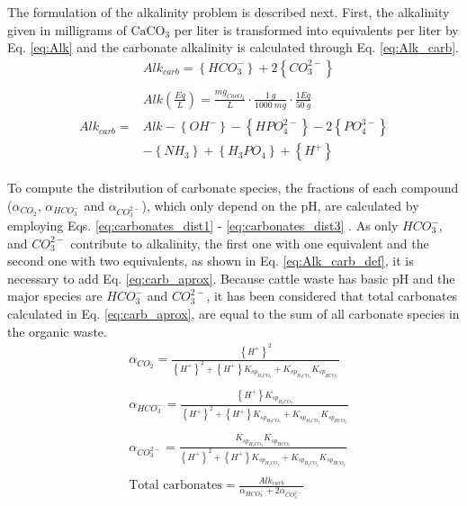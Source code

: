 \begin{refsection}[referencesCh3]
The formulation of the alkalinity problem is described next. First, the alkalinity given in milligrams of $\text{CaCO}_{3}$ per liter is transformed into equivalents per liter by Eq. \ref{eq:Alk} and the carbonate alkalinity is calculated through Eq. \ref{eq:Alk_carb}.
\begin{align}
&  Alk_{carb}= \left\{HCO_{3}^{-}\right\} + 2\left\{CO_{3}^{2-}\right\} \label{eq:Alk_carb_def}\\
\nonumber \\
& Alk \left(\frac{Eq}{L}\right) = \frac{mg_{CacO_{3}}}{L} \cdot \frac{1 \ g}{1000 \ mg} \cdot \frac{1 Eq}{50 \ g} \label{eq:Alk}
\end{align}
\begin{align}
\begin{split}
Alk_{carb}=&Alk-\left\{ OH^{-} \right\}-\left\{ HPO_{4}^{2-} \right\}- 2\left\{ PO_{4}^{3-}\right\} \\&-\left\{ NH_{3} \right\}+\left\{ H_{3}PO_{4} \right\}+\left\{ H^{+} \right\} \label{eq:Alk_carb}
\end{split}
\end{align}

To compute the distribution of carbonate species, the fractions of each compound ($\alpha_{CO_2}$, $\alpha_{HCO_{3}^{-}}$ and $\alpha_{CO_{3}^{2-}}$), which only depend on the pH, are calculated by employing Eqs. \ref{eq:carbonates_dist1} - \ref{eq:carbonates_dist3} \citep{WolfGladrow}. As only $HCO_{3}^{-}$, and $CO_{3}^{2-}$ contribute to alkalinity, the first one with one equivalent and the second one with two equivalents, as shown in Eq. \ref{eq:Alk_carb_def}, it is necessary  to add Eq. \ref{eq:carb_aprox}. Because cattle waste has basic pH and the major species are $HCO_{3}^{-}$ and $CO_{3}^{2-}$, it has been considered that total carbonates calculated in Eq. \ref{eq:carb_aprox}, are equal to the sum of all carbonate species in the organic waste.
\begin{align}
& \alpha_{CO_2} = \frac{\left\{ H^{+} \right\}^{2}}{\left\{ H^{+} \right\}^{2} + \left\{ H^{+} \right\}K_{sp_{H_{2}CO_{3}}}+K_{sp_{H_{2}CO_{3}}}K_{sp_{HCO_{3}^{-}}}} \label{eq:carbonates_dist1} \\
\nonumber \\
& \alpha_{HCO_{3}^{-}} = \frac{\left\{ H^{+} \right\}K_{sp_{H_{2}CO_{3}}}}{\left\{ H^{+} \right\}^{2} + \left\{ H^{+} \right\}K_{sp_{H_{2}CO_{3}}}+K_{sp_{H_{2}CO_{3}}}K_{sp_{HCO_{3}^{-}}}} \label{eq:carbonates_dist2} \\ 
\nonumber \\
& \alpha_{CO_{3}^{2-}} = \frac{K_{sp_{H_{2}CO_{3}}}K_{sp_{HCO_{3}^{-}}}}{\left\{ H^{+} \right\}^{2} + \left\{ H^{+} \right\}K_{sp_{H_{2}CO_{3}}}+K_{sp_{H_{2}CO_{3}}}K_{sp_{HCO_{3}^{-}}}} \label{eq:carbonates_dist3} \\
\nonumber \\
& \text{Total carbonates} = \frac{Alk_{carb}}{\alpha_{HCO_{3}^{-}} + 2 \alpha_{CO_{3}^{2-}}} \label{eq:carb_aprox}
\end{align}


\end{refsection}
